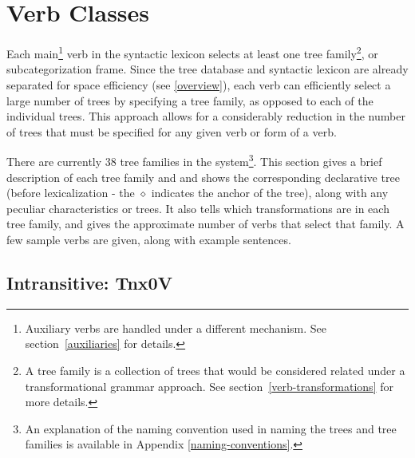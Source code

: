 \section{Verb Classes}
\label{verb-classes}

Each main\footnote{Auxiliary verbs are handled under a different mechanism.
See section~\ref{auxiliaries} for details.} verb in the syntactic
lexicon selects 
at least one tree family\footnote{A tree family is a collection of trees that
would be considered related under a transformational grammar approach.  See
section~\ref{verb-transformations} for more details.}, or subcategorization
frame.  Since the tree database and syntactic lexicon are already separated for
space efficiency (see \ref{overview}), each verb can efficiently select a
large number of trees by specifying a tree family, as opposed to each of the
individual trees.  This approach allows for a considerably reduction in the
number of trees that must be specified for any given verb or form of a verb.

There are currently 38 tree families in the system\footnote{An explanation of
the naming convention used in naming the trees and tree families is available
in Appendix \ref{naming-conventions}.}.  This section gives a brief description
of each tree family and and shows the corresponding declarative tree (before
lexicalization - the $\diamond$ indicates the anchor of the tree), along with
any peculiar characteristics or trees.  It also tells which transformations are
in each tree family, and gives the approximate number of verbs that select that
family.  A few sample verbs are given, along with example sentences.


\subsection{Intransitive: Tnx0V}
\label{nx0V-family}

